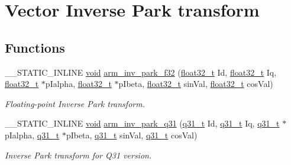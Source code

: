 \hypertarget{group__inv__park}{\section{Vector Inverse Park transform}
\label{group__inv__park}
}
\subsection*{Functions}
\begin{DoxyCompactItemize}
\item 
\-\_\-\-\_\-\-S\-T\-A\-T\-I\-C\-\_\-\-I\-N\-L\-I\-N\-E \hyperlink{group___n_a_m_e_ga18028b8badbf1ea7e704ccac3c488e82}{void} \hyperlink{group__inv__park_ga1fc972ce0ab27c9cb0d8ab792d646a40}{arm\-\_\-inv\-\_\-park\-\_\-f32} (\hyperlink{arm__math_8h_a4611b605e45ab401f02cab15c5e38715}{float32\-\_\-t} Id, \hyperlink{arm__math_8h_a4611b605e45ab401f02cab15c5e38715}{float32\-\_\-t} Iq, \hyperlink{arm__math_8h_a4611b605e45ab401f02cab15c5e38715}{float32\-\_\-t} $\ast$p\-Ialpha, \hyperlink{arm__math_8h_a4611b605e45ab401f02cab15c5e38715}{float32\-\_\-t} $\ast$p\-Ibeta, \hyperlink{arm__math_8h_a4611b605e45ab401f02cab15c5e38715}{float32\-\_\-t} sin\-Val, \hyperlink{arm__math_8h_a4611b605e45ab401f02cab15c5e38715}{float32\-\_\-t} cos\-Val)
\begin{DoxyCompactList}\small\item\em Floating-\/point Inverse Park transform. \end{DoxyCompactList}\item 
\-\_\-\-\_\-\-S\-T\-A\-T\-I\-C\-\_\-\-I\-N\-L\-I\-N\-E \hyperlink{group___n_a_m_e_ga18028b8badbf1ea7e704ccac3c488e82}{void} \hyperlink{group__inv__park_ga3c231629a6ab9afc9b2eb1dd81dad8c4}{arm\-\_\-inv\-\_\-park\-\_\-q31} (\hyperlink{arm__math_8h_adc89a3547f5324b7b3b95adec3806bc0}{q31\-\_\-t} Id, \hyperlink{arm__math_8h_adc89a3547f5324b7b3b95adec3806bc0}{q31\-\_\-t} Iq, \hyperlink{arm__math_8h_adc89a3547f5324b7b3b95adec3806bc0}{q31\-\_\-t} $\ast$p\-Ialpha, \hyperlink{arm__math_8h_adc89a3547f5324b7b3b95adec3806bc0}{q31\-\_\-t} $\ast$p\-Ibeta, \hyperlink{arm__math_8h_adc89a3547f5324b7b3b95adec3806bc0}{q31\-\_\-t} sin\-Val, \hyperlink{arm__math_8h_adc89a3547f5324b7b3b95adec3806bc0}{q31\-\_\-t} cos\-Val)
\begin{DoxyCompactList}\small\item\em Inverse Park transform for Q31 version. \end{DoxyCompactList}\end{DoxyCompactItemize}


